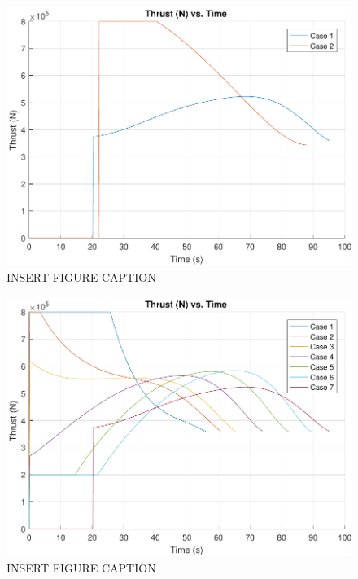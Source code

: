 \begin{figure}[H]
	\centering
	\begin{minipage}{4.5 in}
		\includegraphics[width=\linewidth]{Figures/thratmovsvac.pdf}
		\caption{INSERT FIGURE CAPTION \label{fig:thratmovsvac} }
	\end{minipage}
\end{figure}



\begin{figure}[H]
	\centering
	\begin{minipage}{4.5 in}
		\includegraphics[width=\linewidth]{Figures/thrpowatmo.pdf}
		\caption{INSERT FIGURE CAPTION \label{fig:thrpowatmo} }
	\end{minipage}
\end{figure}



